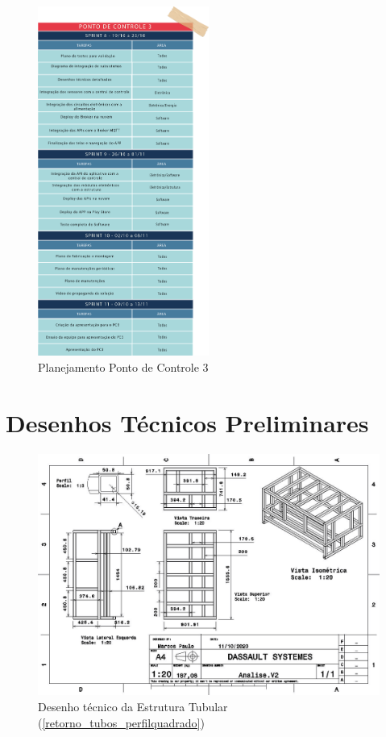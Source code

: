 \begin{apendicesenv}
\begin{figure}[H]
    \centering
    \includegraphics[width=0.5\textwidth]{figuras/sprint-pc3.png}
    \caption{Planejamento Ponto de Controle 3}
    \label{fig:Sprint_pc3}
\end{figure}

\chapter{Desenhos Técnicos Preliminares}\label{cad_preliminar}

\vspace{3cm}

\begin{figure}[H]
    \centering
    \includegraphics[width=1\textwidth]{figuras/estrutura/Desenhos/Estrutura_Tubular.jpg}
    \caption{Desenho técnico da Estrutura Tubular (\ref{retorno_tubos_perfilquadrado})}
    \label{fig:estruturatubular}
\end{figure}


\end{apendicesenv}

